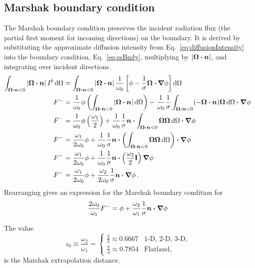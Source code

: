 \subsection{Marshak boundary condition}
The Marshak boundary condition \cite{Mar1947} preserves the incident radiation
flux (the partial first moment for incoming directions) on the boundary. It is
derived by substituting the approximate diffusion
intensity from Eq.~\eqref{eq:diffusionIntensity} into the boundary condition,
Eq.~\eqref{eq:ssBndy}, multiplying by $\left| \bm{\Omega}\bm{\cdot} \bm{n} \right|$, and integrating over
incident directions.
\begin{align*}
\int_{\bm{\Omega}\bm{\cdot} \bm{n} < 0 } \left| \bm{\Omega}\bm{\cdot} \bm{n} \right|
I^b \mathop{}\!\mathrm{d}\Omega
 &= 
\int_{\bm{\Omega}\bm{\cdot} \bm{n} < 0 } \left| \bm{\Omega}\bm{\cdot} \bm{n} \right| 
 \frac{1}{\omega_0} \left[ \phi - \frac{1}{\sigma}
  \bm{\Omega} \bm{\cdot} \bm{\nabla} \phi \right]
  \mathop{}\!\mathrm{d}\Omega
\\
F^{-}
&= 
\frac{1}{\omega_0} \phi \left( \int_{\bm{\Omega}\bm{\cdot} \bm{n} < 0 }
\left| \bm{\Omega}\bm{\cdot} \bm{n} \right| \mathop{}\!\mathrm{d}\Omega \right) 
  - \frac{1}{\omega_0}\frac{1}{\sigma}
  \int_{\bm{\Omega}\bm{\cdot} \bm{n} < 0 } (-\bm{\Omega}\bm{\cdot} \bm{n})
  \bm{\Omega} \mathop{}\!\mathrm{d}\Omega  \bm{\cdot} \bm{\nabla} \phi
\\
F^{-}
&=
\frac{1}{\omega_0} \phi \left( \frac{\omega_1}{2} \right) 
  + \frac{1}{\omega_0}\frac{1}{\sigma} \bm{n} \bm{\cdot}
  \int_{\bm{\Omega}\bm{\cdot} \bm{n} < 0 } \bm{\Omega} \bm{\Omega} \mathop{}\!\mathrm{d}\Omega
  \bm{\cdot} \bm{\nabla} \phi
\\
F^{-}
&=
\frac{\omega_1}{2\omega_0} \phi 
  + \frac{1}{\omega_0}\frac{1}{\sigma} \bm{n} \bm{\cdot}
  \left( \int_{\bm{\Omega}\bm{\cdot} \bm{n} < 0 } \bm{\Omega} \bm{\Omega} \mathop{}\!\mathrm{d}\Omega \right)
  \bm{\cdot} \bm{\nabla} \phi
\\
F^{-}
&=
\frac{\omega_1}{2\omega_0} \phi
+ \frac{1}{\omega_0}\frac{1}{\sigma} \bm{n} \bm{\cdot} \left( \frac{\omega_2}{2}
\mathbf{I} \right) \bm{\nabla} \phi
\\
F^{-}
&=
\frac{\omega_1}{2\omega_0} \phi
+ \frac{\omega_2}{2\omega_0}\frac{1}{\sigma} \bm{n} \bm{\cdot} \bm{\nabla} \phi\,.
\end{align*}
Rearranging gives an expression for the Marshak boundary condition for 
\begin{equation} \label{eq:marshak}
\frac{2\omega_0}{\omega_1} F^{-}
=
\phi + \frac{\omega_2}{\omega_1}\frac{1}{\sigma} \bm{n} \bm{\cdot} \bm{\nabla} \phi
\end{equation}

The value
\begin{equation*}
  z_0 \equiv \frac{\omega_2}{\omega_1}
  =
  \begin{cases}
    \frac{2}{3} \approx 0.6667 & \text{1-D, 2-D, 3-D,} \\
    \frac{\pi}{4} \approx 0.7854 & \text{Flatland,}
  \end{cases}
\end{equation*}
is the Marshak extrapolation distance.

